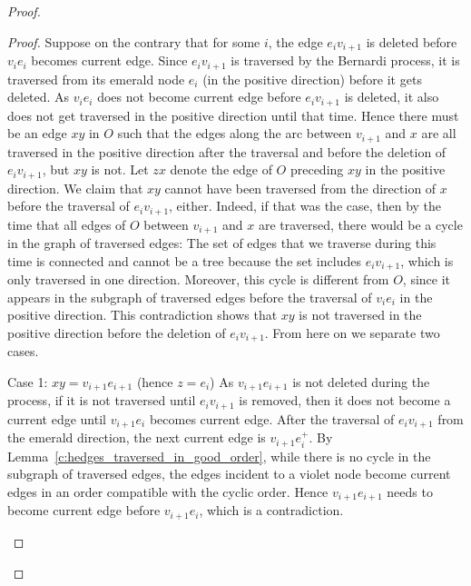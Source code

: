 \documentclass[10pt]{amsart}
\theoremstyle{definition}\newtheorem{defi}[theo]{Definition}
\theoremstyle{remark}\newtheorem{rema}[theo]{Remark}
\newenvironment{enonce*}[2][]{\par\smallskip\noindent\textbf{#2}.\par\nobreak}{\par\smallskip}
\begin{document}
\begin{proof}
\begin{proof}
Suppose on the contrary that for some $i$, the edge $e_iv_{i+1}$ is deleted before $v_ie_i$ becomes current edge. Since $e_iv_{i+1}$ is traversed by the Bernardi process, it is traversed from its emerald node $e_i$ (\ie in the positive direction) before it gets deleted. As $v_ie_i$ does not become current edge before $e_iv_{i+1}$ is deleted, it also does not get traversed in the positive direction until that time. Hence there must be an edge $xy$ in $O$ such that the edges along the arc between $v_{i+1}$ and $x$ are all traversed in the positive direction after the traversal and 
before the deletion of $e_iv_{i+1}$, but $xy$ is not. Let $zx$ denote the edge of $O$ preceding $xy$ in the positive direction. We claim that $xy$ cannot have been traversed from the direction of $x$ before the traversal of $e_iv_{i+1}$, either. Indeed, if that was the case, then by the time that all edges of $O$ between $v_{i+1}$ and $x$ are traversed, there would be a cycle in the graph of traversed edges: The set of edges that we traverse during this time is connected and cannot be a tree because the set includes $e_iv_{i+1}$, which is only traversed in one direction. Moreover, this cycle is different from $O$, since it appears in the subgraph of traversed edges before the traversal of $v_ie_i$ in the positive direction. This contradiction shows that $xy$ is not traversed in the positive direction before the deletion of $e_iv_{i+1}$. From here on we separate two cases.

\begin{enonce*}[remark]{Case 1: $xy=v_{i+1}e_{i+1}$ (hence $z=e_i$)}
As $v_{i+1}e_{i+1}$ is not deleted during the process, if it is not traversed until $e_iv_{i+1}$ is removed, then it does not become a current edge until $v_{i+1}e_i$ becomes current edge. After the traversal of $e_iv_{i+1}$ from the emerald direction, the next current edge is $v_{i+1}e_i^+$. By Lemma~\ref{c:hedges_traversed_in_good_order}, while there is no cycle in the subgraph of traversed edges, the edges incident to a violet node become current edges in an order compatible with the cyclic order. Hence $v_{i+1}e_{i+1}$ needs to become current edge before $v_{i+1}e_i$, which is a contradiction.
\end{enonce*}


\end{proof}
\end{proof}
\end{document}
